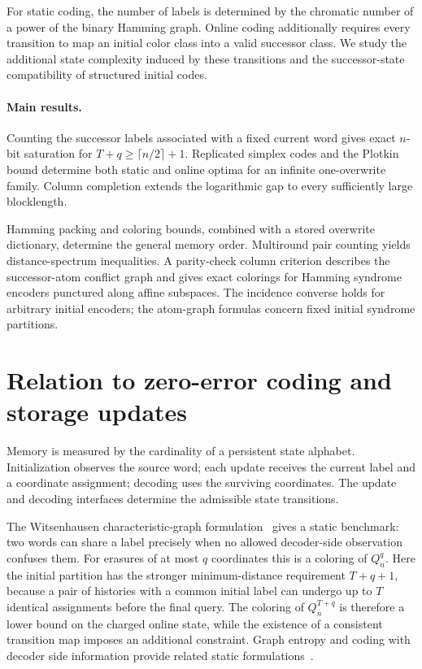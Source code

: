 \documentclass[11pt,a4paper]{article}
\begin{document}
For static coding, the number of labels is determined by the chromatic number of a power of the binary Hamming graph. Online coding additionally requires every transition to map an initial color class into a valid successor class. We study the additional state complexity induced by these transitions and the successor-state compatibility of structured initial codes.

\paragraph{Main results.}
Counting the successor labels associated with a fixed current word gives exact $n$-bit saturation for $T+q\ge\lceil n/2\rceil+1$. Replicated simplex codes and the Plotkin bound determine both static and online optima for an infinite one-overwrite family. Column completion extends the logarithmic gap to every sufficiently large blocklength.

Hamming packing and coloring bounds, combined with a stored overwrite dictionary, determine the general memory order. Multiround pair counting yields distance-spectrum inequalities. A parity-check column criterion describes the successor-atom conflict graph and gives exact colorings for Hamming syndrome encoders punctured along affine subspaces. The incidence converse holds for arbitrary initial encoders; the atom-graph formulas concern fixed initial syndrome partitions.
\section{Relation to zero-error coding and storage updates}\label{sec:related}
Memory is measured by the cardinality of a persistent state alphabet. Initialization observes the source word; each update receives the current label and a coordinate assignment; decoding uses the surviving coordinates. The update and decoding interfaces determine the admissible state transitions.

The Witsenhausen characteristic-graph formulation~\cite{witsenhausen1976} gives a static benchmark: two words can share a label precisely when no allowed decoder-side observation confuses them. For erasures of at most $q$ coordinates this is a coloring of $Q_n^q$. Here the initial partition has the stronger minimum-distance requirement $T+q+1$, because a pair of histories with a common initial label can undergo up to $T$ identical assignments before the final query. The coloring of $Q_n^{T+q}$ is therefore a lower bound on the charged online state, while the existence of a consistent transition map imposes an additional constraint. Graph entropy and coding with decoder side information provide related static formulations~\cite{koulgi2003,orlitsky2001,bakshi2010}.
\end{document}
